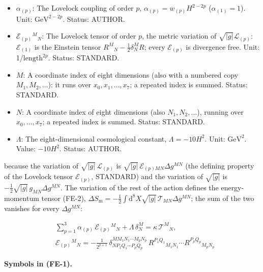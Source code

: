 \documentclass[
  10pt,
]{article}
\begin{document}
\begin{itemize}
  \(p\): The Lovelock order \(p = 1, 2, 3\) (Einstein, Gauss-Bonnet,
  cubic). Status: STANDARD.
\item
  \(\alpha_{(p)}\): The Lovelock coupling of order \(p\),
  \(\alpha_{(p)} = w_{(p)}H^{2-2p}\) (\(\alpha_{(1)} = 1\)). Unit:
  \(\mathrm{GeV}^{2-2p}\). Status: AUTHOR.
\item
  \(\mathcal{E}_{(p)}{}^M{}_N\): The Lovelock tensor of order \(p\), the
  metric variation of \(\sqrt{\lvert g\rvert}\mathcal{L}_{(p)}\):
  \(\mathcal{E}_{(1)}\) is the Einstein tensor
  \(R^M{}_N - \frac12\delta^M_NR\); every \(\mathcal{E}_{(p)}\) is
  divergence free. Unit: 1/\(\mathrm{length}^{2p}\). Status: STANDARD.
\item
  \(M\): A coordinate index of eight dimensions (also with a numbered
  copy \(M_1, M_2, \dots\)): it runs over \(x_0, x_1, \dots, x_7\); a
  repeated index is summed. Status: STANDARD.
\item
  \(N\): A coordinate index of eight dimensions (also
  \(N_1, N_2, \dots\)), running over \(x_0, \dots, x_7\); a repeated
  index is summed. Status: STANDARD.
\item
  \(\Lambda\): The eight-dimensional cosmological constant,
  \(\Lambda = -10H^2\). Unit: \(\mathrm{GeV}^{2}\). Value: \(-10H^2\).
  Status: AUTHOR.
\end{itemize}

because the variation of \(\sqrt{\lvert g\rvert}\,\mathcal{L}_{(p)}\) is
\(\sqrt{\lvert g\rvert}\,\mathcal{E}_{(p)MN}\Delta g^{MN}\) (the
defining property of the Lovelock tensor \(\mathcal{E}_{(p)}\),
STANDARD) and the variation of \(\sqrt{\lvert g\rvert}\) is
\(-\frac12\sqrt{\lvert g\rvert}\,g_{MN}\Delta g^{MN}\). The variation of
the rest of the action defines the energy-momentum tensor (FE-2),
\(\Delta S_{\mathrm{m}} = -\frac12\int\mathrm{d}^8X\sqrt{\lvert g\rvert}\, \mathcal{T}_{MN}\Delta g^{MN}\);
the sum of the two vanishes for every \(\Delta g^{MN}\):

\[
\begin{aligned}
&\sum_{p=1}^{3}\alpha_{(p)}\,\mathcal{E}_{(p)}{}^M{}_N + \Lambda\,\delta^M_N = \kappa\,\mathcal{T}^M{}_N,\\
&\mathcal{E}_{(p)}{}^M{}_N = -\frac{1}{2^{p+1}}\,\delta^{MM_1N_1\cdots M_pN_p}_{NP_1Q_1\cdots P_pQ_p}\,
 R^{P_1Q_1}{}_{M_1N_1}\cdots R^{P_pQ_p}{}_{M_pN_p}
\end{aligned} \tag{FE-1}
\]

\textbf{Symbols in (FE-1).}
\end{document}
